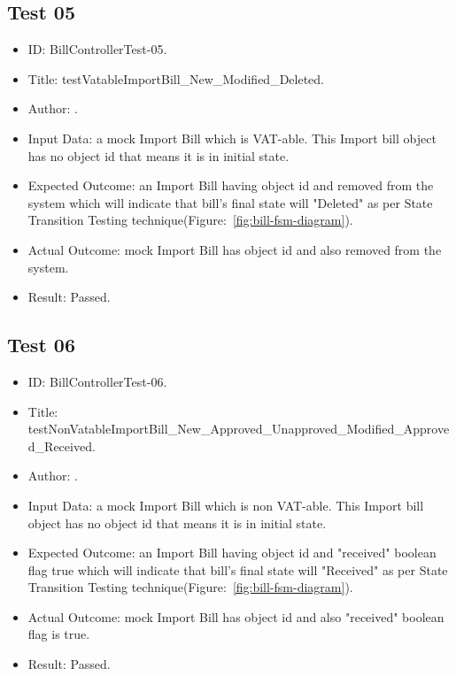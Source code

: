 \documentclass[12pt]{article}
\makeatletter
\let\theauthor\@author
\makeatother
\begin{document}
\subsection{Test 05}
\begin{itemize}
	
    \item ID: BillControllerTest-05.
    
    \item Title: testVatableImportBill\_New\_Modified\_Deleted.
    
    \item Author: \theauthor.
    
    \item Input Data: a mock Import Bill which is VAT-able. This Import bill object has no object id that means it is in initial state.
    
    \item Expected Outcome: an Import Bill having object id and removed from the system which will indicate that bill's final state will "Deleted" as per State Transition Testing technique(Figure:~\ref{fig:bill-fsm-diagram}).
    
    \item Actual Outcome: mock Import Bill has object id and also removed from the system.
    
    \item Result: Passed.

\end{itemize}

\subsection{Test 06}
\begin{itemize}
	
    \item ID: BillControllerTest-06.
    
    \item Title: testNonVatableImportBill\_New\_Approved\_Unapproved\_Modified\_Approved\_Received.
    
    \item Author: \theauthor.
    
    \item Input Data: a mock Import Bill which is non VAT-able. This Import bill object has no object id that means it is in initial state.
    
    \item Expected Outcome: an Import Bill having object id and "received" boolean flag true which will indicate that bill's final state will "Received" as per State Transition Testing technique(Figure:~\ref{fig:bill-fsm-diagram}).
    
    \item Actual Outcome: mock Import Bill has object id and also "received" boolean flag is true.
    
    \item Result: Passed.

\end{itemize}
\end{document}
